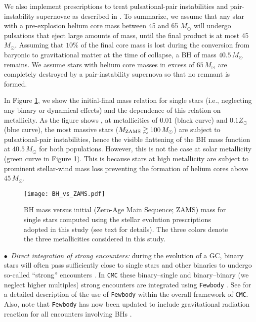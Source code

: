 \documentclass[twocolumn,tighten]{aastex63}
\begin{document}
    We also implement prescriptions to treat pulsational-pair instabilities and pair-instability supernovae as described in \citet{Belczynski2016b}. To summarize, we assume that any star with a pre-explosion helium core mass between 45 and 65 $M_{\odot}$ will undergo pulsations that eject large amounts of mass, until the final product is at most 45 $M_{\odot}$. Assuming that $10\%$ of the final core mass is lost during the conversion from baryonic to gravitational matter at the time of collapse, a BH of mass $40.5\,M_{\odot}$ remains. We assume stars with helium core masses in excess of $65\,M_{\odot}$ are completely destroyed by a pair-instability supernova so that no remnant is formed.

    In Figure \ref{fig:BH_vs_ZAMS}, we show the initial-final mass relation for single stars (i.e., neglecting any binary or dynamical effects) and the dependence of this relation on metallicity. As the figure shows \citep[and as is discussed in detail in, e.g.,][]{Belczynski2016b}, at metallicities of $0.01$ (black curve) and $0.1Z_{\odot}$ (blue curve), the most massive stars ($M_{\rm{ZAMS}} \gtrsim 100\,M_{\odot}$) are subject to pulsational-pair instabilities, hence the visible flattening of the BH mass function at $40.5\,M_{\odot}$ for both populations. However, this is not the case at solar metallicity (green curve in Figure \ref{fig:BH_vs_ZAMS}). This is because stars at high metallicity are subject to prominent stellar-wind mass loss \citep[again, adopting the stellar wind prescriptions of][]{Vink2001} preventing the formation of helium cores above $45\,M_{\odot}$.

\begin{figure}
\begin{center}
\texttt{[image: BH\_vs\_ZAMS.pdf]}
\caption{\footnotesize \label{fig:BH_vs_ZAMS} BH mass versus initial (Zero-Age Main Sequence; ZAMS) mass for single stars computed using the stellar evolution prescriptions adopted in this study (see text for details). The three colors denote the three metallicities considered in this study.}
\end{center}
\end{figure}    
    
    $\bullet\,$ \textit{Direct integration of strong encounters:} during the evolution of a GC, binary stars will often pass sufficiently close to single stars and other binaries to undergo so-called ``strong'' encounters \citep[e.g.,][]{HeggieHut2003}. In \texttt{CMC} these binary--single and binary--binary (we neglect higher multiples) strong encounters are integrated using \texttt{Fewbody} \citep{Fregeau2004,Fregeau2007}. See \citet{Fregeau2007} for a detailed description of the use of \texttt{Fewbody} within the overall framework of \texttt{CMC}. Also, note that \texttt{Fewbody} has now been updated to include gravitational radiation reaction for all encounters involving BHs \citep[see][for more information]{Rodriguez2018a,Rodriguez2018b}.
    
\end{document}
